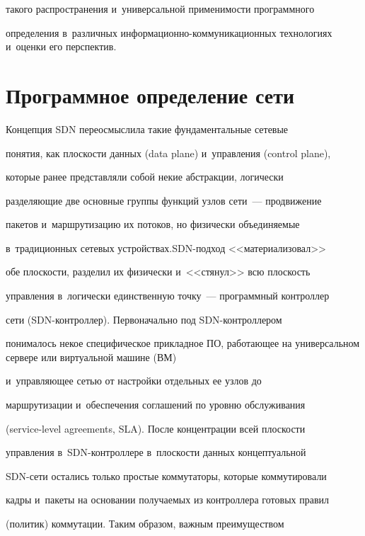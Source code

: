такого распространения и~универсальной применимости программного 


определения в~различных ин\-фор\-ма\-ци\-он\-но-ком\-му\-ни\-ка\-ци\-он\-ных технологиях и~оценки его перспектив.





\section{Программное определение сети}





    Концепция SDN переосмыслила такие фундаментальные сетевые 


понятия, как плоскости данных (data plane) и~управления (control plane), 


которые ранее представляли собой некие абстракции, логически 


разделяющие две основные группы функций узлов сети~--- продвижение 


пакетов и~маршрутизацию их потоков, но физически объединяемые 


в~традиционных сетевых устройствах.\linebreak SDN-под\-ход <<материализовал>> 


обе плоскости, разделил их физически и~<<стянул>> всю плос\-кость 


управления в~логически единственную точ\-ку~--- программный контроллер 


сети (SDN-конт\-рол\-лер). Первоначально под SDN-конт\-рол\-лером 


понималось некое специфическое прикладное ПО, ра\-бо\-та\-ющее на универсальном сервере или виртуальной машине (ВМ) 


и~управ\-ля\-ющее сетью от на\-строй\-ки отдельных ее узлов до 


маршрутизации и~обес\-пе\-че\-ния соглашений по уров\-ню обслуживания 


(service-level agreements, SLA). После концентрации всей плос\-кости 


управления в~SDN-конт\-рол\-ле\-ре в~плос\-кости данных концептуальной 


SDN-сети остались только прос\-тые коммутаторы, которые коммутировали 


кадры и~пакеты на основании по\-лу\-ча\-емых из контроллера готовых правил 


(политик) коммутации. Таким образом, важ\-ным преимуществом  


